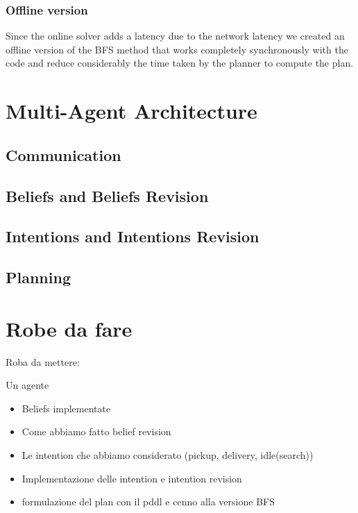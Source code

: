 \documentclass[a4paper, 11pt]{article}
\begin{document}
\subsubsection{Offline version}

Since the online solver adds a latency due to the network latency we created an offline version of the BFS method that works completely synchronously with the code and reduce considerably the time taken by the planner to compute the plan.

\pagebreak

\section{Multi-Agent Architecture}


\subsection{Communication}


\subsection{Beliefs and Beliefs Revision}


\subsection{Intentions and Intentions Revision}


\subsection{Planning}






\pagebreak

\section{Robe da fare}

Roba da mettere:

Un agente
\begin{itemize}
\item Beliefs implementate
\item Come abbiamo fatto belief revision
\item Le intention che abbiamo considerato (pickup, delivery, idle(search))
\item Implementazione delle intention e intention revision
\item formulazione del plan con il pddl e cenno alla versione BFS
\end{itemize}
\end{document}
